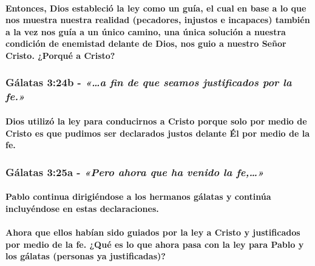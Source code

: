 \documentclass[11a pt,twoside]{article}
\newcommand{\scripture}[1]{%
  {\fontsize{12pt}{16pt}\selectfont\ScriptureFont\itshape #1}%
}
\let\oldsubsubsection\subsubsection
\renewcommand{\subsubsection}{\needspace{4\baselineskip}\oldsubsubsection}
\let\oldparagraph\paragraph
\renewcommand{\paragraph}{\needspace{3\baselineskip}\oldparagraph}
\begin{document}
\paragraph{Entonces, Dios estableció la ley como un guía, el cual en
base a lo que nos muestra nuestra realidad (pecadores, injustos e
incapaces) también a la vez nos guía a un único camino, una única
solución a nuestra condición de enemistad delante de Dios, nos guio a
nuestro Señor Cristo. ¿Porqué a
Cristo?}\label{entonces-dios-estableciuxf3-la-ley-como-un-guuxeda-el-cual-en-base-a-lo-que-nos-muestra-nuestra-realidad-pecadores-injustos-e-incapaces-tambiuxe9n-a-la-vez-nos-guuxeda-a-un-uxfanico-camino-una-uxfanica-soluciuxf3n-a-nuestra-condiciuxf3n-de-enemistad-delante-de-dios-nos-guio-a-nuestro-seuxf1or-cristo.-porquuxe9-a-cristo}

\subsubsection{\texorpdfstring{Gálatas 3:24b -
\scripture{«…a fin de que seamos justificados por la fe.»}}{Gálatas 3:24b - }}\label{guxe1latas-324b---a-fin-de-que-seamos-justificados-por-la-fe.}

\paragraph{Dios utilizó la ley para conducirnos a Cristo porque solo por
medio de Cristo es que pudimos ser declarados justos delante Él por
medio de la
fe.}\label{dios-utilizuxf3-la-ley-para-conducirnos-a-cristo-porque-solo-por-medio-de-cristo-es-que-pudimos-ser-declarados-justos-delante-uxe9l-por-medio-de-la-fe.}

\subsubsection{\texorpdfstring{Gálatas 3:25a -
\scripture{«Pero ahora que ha venido la fe,…»}}{Gálatas 3:25a - }}\label{guxe1latas-325a---pero-ahora-que-ha-venido-la-fe}

\paragraph{Pablo continua dirigiéndose a los hermanos gálatas y continúa
incluyéndose en estas
declaraciones.}\label{pablo-continua-dirigiuxe9ndose-a-los-hermanos-guxe1latas-y-continuxfaa-incluyuxe9ndose-en-estas-declaraciones.}

\paragraph{Ahora que ellos habían sido guiados por la ley a Cristo y
justificados por medio de la fe. ¿Qué es lo que ahora pasa con la ley
para Pablo y los gálatas (personas ya
justificadas)?}\label{ahora-que-ellos-habuxedan-sido-guiados-por-la-ley-a-cristo-y-justificados-por-medio-de-la-fe.-quuxe9-es-lo-que-ahora-pasa-con-la-ley-para-pablo-y-los-guxe1latas-personas-ya-justificadas}
\end{document}
